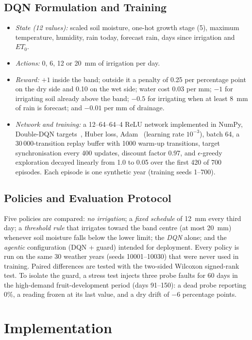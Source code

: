 \documentclass[conference]{IEEEtran}
\begin{document}
\subsection{DQN Formulation and Training}
\begin{itemize}
\item \textit{State (12 values):} scaled soil moisture, one-hot growth stage (5), maximum temperature, humidity, rain today, forecast rain, days since irrigation and $ET_0$.
\item \textit{Actions:} 0, 6, 12 or 20~mm of irrigation per day.
\item \textit{Reward:} $+1$ inside the band; outside it a penalty of 0.25 per percentage point on the dry side and 0.10 on the wet side; water cost 0.03 per mm; $-1$ for irrigating soil already above the band; $-0.5$ for irrigating when at least 8~mm of rain is forecast; and $-0.01$ per mm of drainage.
\item \textit{Network and training:} a 12--64--64--4 ReLU network implemented in NumPy, Double-DQN targets~\cite{vanhasselt2016}, Huber loss, Adam~\cite{kingma2015} (learning rate $10^{-3}$), batch 64, a 30\,000-transition replay buffer with 1000 warm-up transitions, target synchronisation every 400 updates, discount factor 0.97, and $\epsilon$-greedy exploration decayed linearly from 1.0 to 0.05 over the first 420 of 700 episodes. Each episode is one synthetic year (training seeds 1--700).
\end{itemize}

\subsection{Policies and Evaluation Protocol}
Five policies are compared: \textit{no irrigation}; a \textit{fixed schedule} of 12~mm every third day; a \textit{threshold rule} that irrigates toward the band centre (at most 20~mm) whenever soil moisture falls below the lower limit; the \textit{DQN} alone; and the \textit{agentic} configuration (DQN + guard) intended for deployment. Every policy is run on the same 30 weather years (seeds 10001--10030) that were never used in training. Paired differences are tested with the two-sided Wilcoxon signed-rank test. To isolate the guard, a stress test injects three probe faults for 60 days in the high-demand fruit-development period (days 91--150): a dead probe reporting 0\%, a reading frozen at its last value, and a dry drift of $-6$ percentage points.

\section{Implementation}
\end{document}
